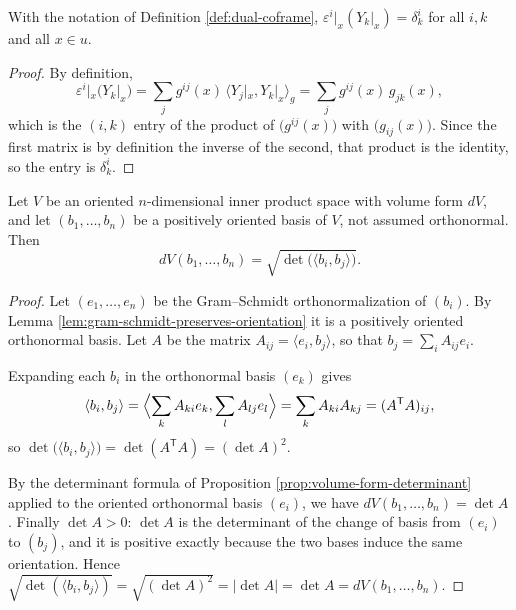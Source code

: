 \begin{lemma}
\label{lem:dual-coframe-duality}
\leanok
{}
With the notation of Definition \ref{def:dual-coframe}, $\varepsilon^i|_x(Y_k|_x) = \delta^i_k$
for all $i,k$ and all $x \in u$.
\end{lemma}

\begin{proof}
\leanok
{}
By definition,
\[
\varepsilon^i|_x(Y_k|_x) = \sum_j g^{ij}(x) \, \langle Y_j|_x, Y_k|_x \rangle_g
  = \sum_j g^{ij}(x) \, g_{jk}(x),
\]
which is the $(i,k)$ entry of the product of $\bigl(g^{ij}(x)\bigr)$ with $\bigl(g_{ij}(x)\bigr)$.
Since the first matrix is by definition the inverse of the second, that product is the identity,
so the entry is $\delta^i_k$.
\end{proof}

\begin{lemma}
\label{lem:volume-form-gram-determinant}
\leanok
{}
Let $V$ be an oriented $n$-dimensional inner product space with volume form $dV$, and let
$(b_1,\ldots,b_n)$ be a positively oriented basis of $V$, not assumed orthonormal. Then
\[
dV(b_1,\ldots,b_n) = \sqrt{\det\bigl(\langle b_i, b_j \rangle\bigr)} .
\]
\end{lemma}

\begin{proof}
\leanok
{}
Let $(e_1,\ldots,e_n)$ be the Gram--Schmidt orthonormalization of $(b_i)$. By Lemma
\ref{lem:gram-schmidt-preserves-orientation} it is a positively oriented orthonormal basis. Let
$A$ be the matrix $A_{ij} = \langle e_i, b_j \rangle$, so that $b_j = \sum_i A_{ij} e_i$.

Expanding each $b_i$ in the orthonormal basis $(e_k)$ gives
\[
\langle b_i, b_j \rangle = \Bigl\langle \sum_k A_{ki} e_k, \sum_l A_{lj} e_l \Bigr\rangle
  = \sum_k A_{ki} A_{kj} = (A^{\mathsf T} A)_{ij},
\]
so $\det\bigl(\langle b_i, b_j\rangle\bigr) = \det(A^{\mathsf T}A) = (\det A)^2$.

By the determinant formula of Proposition \ref{prop:volume-form-determinant} applied to the
oriented orthonormal basis $(e_i)$, we have $dV(b_1,\ldots,b_n) = \det A$. Finally $\det A > 0$:
$\det A$ is the determinant of the change of basis from $(e_i)$ to $(b_j)$, and it is positive
exactly because the two bases induce the same orientation. Hence
$\sqrt{\det(\langle b_i,b_j\rangle)} = \sqrt{(\det A)^2} = |\det A| = \det A = dV(b_1,\ldots,b_n)$.
\end{proof}

